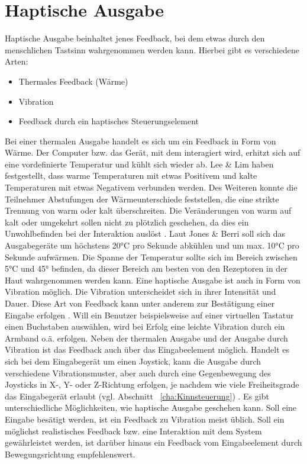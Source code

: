 \section{Haptische Ausgabe}
Haptische Ausgabe beinhaltet jenes Feedback, bei dem etwas durch den menschlichen Tastsinn wahrgenommen werden kann. Hierbei gibt es verschiedene Arten:
%
%
\begin{itemize}
      \item Thermales Feedback (Wärme)
      \item Vibration
			\item Feedback durch ein haptisches Steuerungselement
\end{itemize}
\vspace{\baselineskip}
%
%
Bei einer thermalen Ausgabe handelt es sich um ein Feedback in Form von Wärme. Der Computer bzw. das Gerät, mit dem interagiert wird, erhitzt sich auf eine vordefinierte Temperatur und kühlt sich wieder ab. Lee \& Lim \cite{LeeLim} haben festgestellt, dass warme Temperaturen mit etwas Positivem und kalte Temperaturen mit etwas Negativem verbunden werden. Des Weiteren konnte die Teilnehmer Abstufungen der Wärmeunterschiede feststellen, die eine strikte Trennung von warm oder kalt überschreiten. Die Veränderungen von warm auf kalt oder umgekehrt sollen nicht zu plötzlich geschehen, da dies ein Unwohlbefinden bei der Interaktion auslöst \cite{LeeLim}. \newline
Laut Jones & Berri \cite{JonesBerris} soll sich das Ausgabegeräte um höchstens 20°C pro Sekunde abkühlen und um max. 10°C pro Sekunde aufwärmen. Die Spanne der Temperatur sollte sich im Bereich zwischen 5°C und 45° befinden, da dieser Bereich am besten von den Rezeptoren in der Haut wahrgenommen werden kann.
\newline \newline
Eine haptische Ausgabe ist auch in Form von Vibration möglich. Die Vibration unterscheidet sich in ihrer Intensität und Dauer. Diese Art von Feedback kann unter anderem zur Bestätigung einer Eingabe erfolgen \cite{Vibration}. Will ein Benutzer beispielsweise auf einer virtuellen Tastatur einen Buchstaben auswählen, wird bei Erfolg eine leichte Vibration durch ein Armband o.ä. erfolgen.
\newline \newline
Neben der thermalen Ausgabe und der Ausgabe durch Vibration ist das Feedback auch über das Eingabeelement möglich. Handelt es sich bei dem Eingabegerät um einen Joystick, kann die Ausgabe durch verschiedene Vibrationsmuster, aber auch durch eine Gegenbewegung des Joysticks in X-, Y- oder Z-Richtung erfolgen, je nachdem wie viele Freiheitsgrade das Eingabegerät erlaubt (vgl. Abschnitt ~\ref{cha:Kinnsteuerung}) \cite{an2002haptic}. 
\newline \newline
Es gibt unterschiedliche Möglichkeiten, wie haptische Ausgabe geschehen kann. Soll eine Eingabe besätigt werden, ist ein Feedback zu Vibration meist üblich. Soll ein möglichst realistisches Feedback bzw. eine Interaktion mit dem System gewährleistet werden, ist darüber hinaus ein Feedback vom Eingabeelement durch Bewegungsrichtung empfehlenswert.  
\newpage
